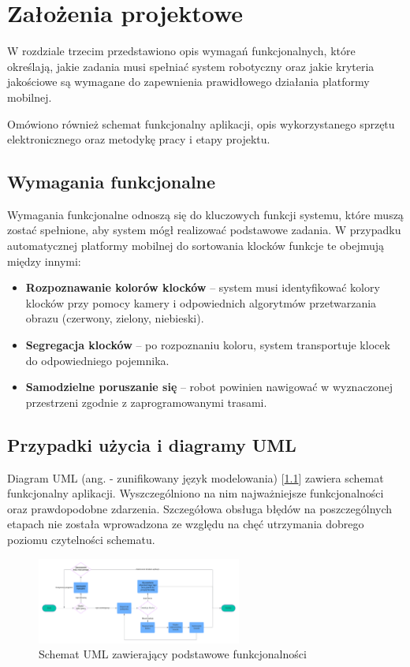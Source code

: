 \chapter{Założenia projektowe}
\label{ch:zalozenia-wstepne}

W rozdziale trzecim przedstawiono opis wymagań funkcjonalnych, które określają, jakie zadania musi spełniać system robotyczny oraz jakie kryteria jakościowe są wymagane do zapewnienia prawidłowego działania platformy mobilnej. 

Omówiono również schemat funkcjonalny aplikacji, opis wykorzystanego sprzętu elektronicznego oraz metodykę pracy i etapy projektu.
 

\section{Wymagania funkcjonalne}
Wymagania funkcjonalne odnoszą się do kluczowych funkcji systemu, które muszą zostać spełnione, aby system mógł realizować podstawowe zadania. W przypadku automatycznej platformy mobilnej do sortowania klocków funkcje te obejmują między innymi:
\begin{itemize}
    \item \textbf{Rozpoznawanie kolorów klocków} – system musi identyfikować kolory klocków przy pomocy kamery i odpowiednich algorytmów przetwarzania obrazu (czerwony, zielony, niebieski).
    \item \textbf{Segregacja klocków} – po rozpoznaniu koloru, system transportuje klocek do odpowiedniego pojemnika.
    \item \textbf{Samodzielne poruszanie się} – robot powinien nawigować w wyznaczonej przestrzeni zgodnie z zaprogramowanymi trasami.
\end{itemize}

\section{Przypadki użycia i diagramy UML}

Diagram UML (ang.  - zunifikowany język modelowania) [\ref{rys1:schemat_uml}] zawiera schemat funkcjonalny aplikacji. Wyszczególniono na nim najważniejsze funkcjonalności oraz prawdopodobne zdarzenia. Szczegółowa obsługa błędów na poszczególnych etapach nie została wprowadzona ze względu na chęć utrzymania dobrego poziomu czytelności schematu. 

\begin{figure}[h!]
    \centering
    \includegraphics[angle=90,origin=c,width=0.6\textwidth]{./graf/uml.png}
    \caption{Schemat UML zawierający podstawowe funkcjonalności}
    \label{rys1:schemat_uml}
\end{figure}

